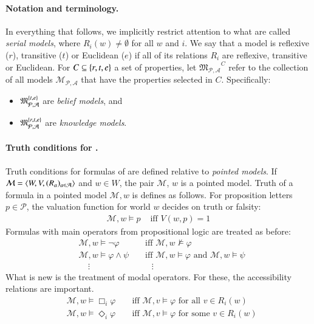\documentclass[nobib,nofonts]{tufte-handout}
\renewcommand{\phi}{\ensuremath{\varphi}}
\newcommand{\Model}{\ensuremath{\mathcal{M}}}
\newcommand{\Models}{\ensuremath{\mathfrak{M}_{\mathcal{P},\mathcal{A}}}}
\newcommand{\modlog}{\acro{ModLog}}
\begin{document}
\bigskip


\paragraph{Notation and terminology.}

In everything that follows, we implicitly restrict attention to what are called \emph{serial models}, where $R_i(w) \neq \emptyset$ for all $w$ and $i$.
We say that a model is reflexive ($r$), transitive ($t$) or Euclidean ($e$) if all of its relations $R_i$ are reflexive, transitive or Euclidean.
For $C \subseteq \left\{r,t,e\right\}$ a set of properties, let $\Models^C$ refer to the collection of all models $\Model_{\mathcal{P},\mathcal{A}}$ that have the properties selected in $C$.
Specifically:
\begin{itemize}[]
  \item $\Models^{\set{t,e}}$ are \emph{belief models}, and
  \item $\Models^{\set{r,t,e}}$ are \emph{knowledge models}.
\end{itemize}



\paragraph{Truth conditions for \modlog.}
Truth conditions for formulas of \modlog are defined relative to \emph{pointed models}.
If $\Model = \tuple{W,V,(R_a)_{a \in \mathcal{A}}}$ and $w \in W$, the pair $\Model$, $w$ is a pointed model.
Truth of a formula in a pointed model $\Model,w$ is defines as follows.
For proposition letters $p \in \mathcal{P}$, the valuation function for world $w$ decides on truth or falsity:
%
\begin{align*}
  \Model, w \models p & \text{ \ iff \  } V(w,p) = 1
\end{align*}
%
Formulas with main operators from propositional logic are treated as before:
%
\begin{align*}
  &\Model, w \models \neg \phi && \text{ \ iff \ } \Model, w \not \models \phi \\
  &\Model, w \models \phi \wedge \psi && \text{ \ iff \ } \Model, w \models \phi \text{ \ and \ } \Model, w \models \psi \\
  & \ \ \ \ \  \vdots && \ \ \ \ \ \vdots
\end{align*}
%
What is new is the treatment of modal operators.
For these, the accessibility relations are important.
%
\begin{align*}
    & \Model, w \models \Box_i \phi & & \text{ \ iff \ } \Model, v \models
    \phi \text{ for all $v \in R_i(w)$} \\
    & \Model, w \models \Diamond_i \phi & & \text{ \ iff \ } \Model, v
    \models \phi \text{ \ for some $v \in R_i(w)$}
\end{align*}
\end{document}

